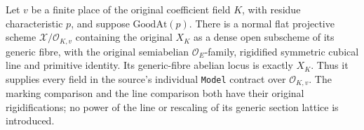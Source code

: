 \begin{theorem}
\label{thm:original-integral-pel-model}
Let $v$ be a finite place of the original coefficient field $K$, with
residue characteristic $p$, and suppose $\mathrm{GoodAt}(p)$.
There is a normal flat projective scheme $\mathcal X/\mathcal O_{K,v}$
containing the original $X_K$ as a dense open subscheme of its generic
fibre, with the original semiabelian $\mathcal O_E$-family, rigidified
symmetric cubical line and primitive identity.  Its generic-fibre
abelian locus is exactly $X_K$.  Thus it supplies every field in the
source's individual \texttt{Model} contract over $\mathcal O_{K,v}$.
The marking comparison and the line comparison both have their
original rigidifications; no power of the line or rescaling of its
generic section lattice is introduced.
\end{theorem}
